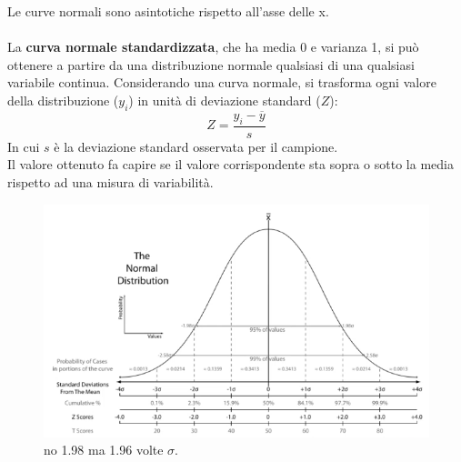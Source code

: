 \documentclass[10pt, draft]{book}
\begin{document}
Le curve normali sono asintotiche rispetto all'asse delle x.
\\
\\
La \textbf{curva normale standardizzata}, che ha media 0 e varianza 1, si può ottenere a partire da una distribuzione normale qualsiasi di una qualsiasi variabile continua. Considerando una curva normale, si trasforma ogni valore della distribuzione ($y_i$) in unità di deviazione standard ($Z$):
\begin{equation}
    Z = \frac{y_i - \overline{y}}{s}
\end{equation}
In cui $s$ è la deviazione standard osservata per il campione.
\\
Il valore ottenuto fa capire se il valore corrispondente sta sopra o sotto la media rispetto ad una misura di variabilità.\\
\begin{figure}[h]\label{standardizednormalcurve}
    \centering
    \includegraphics[width=\textwidth]{standardizednormalcurve}
    \caption{\small{no 1.98 ma 1.96 volte $\sigma$.}}
\end{figure}
\end{document}
